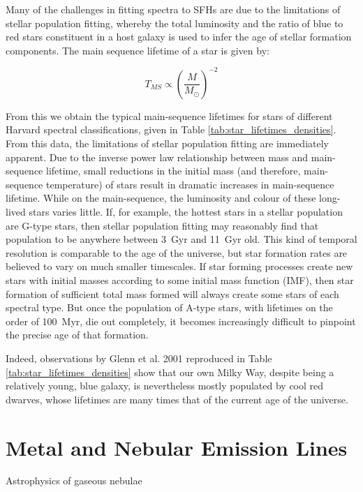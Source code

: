 \documentclass[a4paper,11pt]{article}
\begin{document}
Many of the challenges in fitting spectra to SFHs are due to the limitations of stellar population fitting, whereby the total luminosity and the ratio of blue to red stars constituent in a host galaxy is used to infer the age of stellar formation components. The main sequence lifetime of a star is given by\cite{Prialnik_2010}:

\begin{equation}
  T_{MS} \propto \left(\frac{M}{M_\odot}\right)^{-2}
\end{equation}

\noindent From this we obtain the typical main-sequence lifetimes for stars of different Harvard spectral classifications, given in Table \ref{tab:star_lifetimes_densities}. From this data, the limitations of stellar population fitting are immediately apparent. Due to the inverse power law relationship between mass and main-sequence lifetime, small reductions in the initial mass (and therefore, main-sequence temperature) of stars result in dramatic increases in main-sequence lifetime. While on the main-sequence, the luminosity and colour of these long-lived stars varies little.\cite{Prialnik_2010} If, for example, the hottest stars in a stellar population are G-type stars, then stellar population fitting may reasonably find that population to be anywhere between \SI{3}{Gyr} and \SI{11}{Gyr} old. This kind of temporal resolution is comparable to the age of the universe, but star formation rates are believed to vary on much smaller timescales.\cite{Kauffmann_2003c} If star forming processes create new stars with initial masses according to some initial mass function (IMF), then star formation of sufficient total mass formed will always create some stars of each spectral type. But once the population of A-type stars, with lifetimes on the order of \SI{100}{Myr}, die out completely, it becomes increasingly difficult to pinpoint the precise age of that formation.

Indeed, observations by Glenn et al. 2001 reproduced in Table \ref{tab:star_lifetimes_densities} show that our own Milky Way, despite being a relatively young, blue galaxy, is nevertheless mostly populated by cool red dwarves, whose lifetimes are many times that of the current age of the universe.

\section{Metal and Nebular Emission Lines}

Astrophysics of gaseous nebulae
\end{document}
